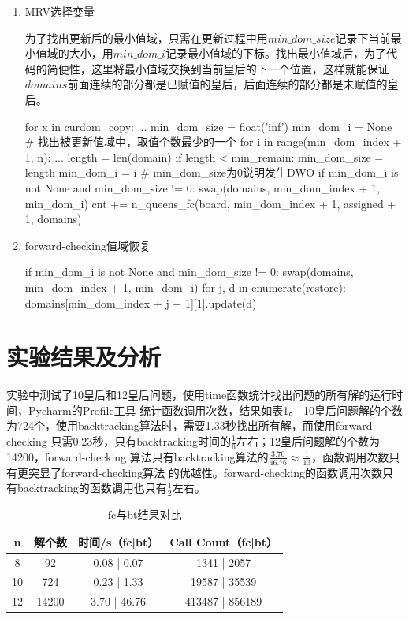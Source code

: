 \documentclass[10pt,letterpaper]{ctexart}
\newcommand{\tabref}[1]{表\ref{#1}}
\begin{document}
\begin{enumerate}[itemindent=2em,label=\arabic*、]
\newpage
\item MRV选择变量
\par \qquad 为了找出更新后的最小值域，只需在更新过程中用$min\_dom\_size$记录下当前最小值域的大小，用$min\_dom\_i$记录最小值域的下标。找出最小值域后，为了代码的简便性，这里将最小值域交换到当前皇后的下一个位置，这样就能保证$domains$前面连续的部分都是已赋值的皇后，后面连续的部分都是未赋值的皇后。
\begin{python}
for x in curdom_copy:
    ...
    min_dom_size = float('inf')
    min_dom_i = None
    # 找出被更新值域中，取值个数最少的一个
    for i in range(min_dom_index + 1, n):
        ...
        length = len(domain)
        if length < min_remain:
            min_dom_size = length
            min_dom_i = i
    # min_dom_size为0说明发生DWO
    if min_dom_i is not None and min_dom_size != 0:
        swap(domains, min_dom_index + 1, min_dom_i)
        cnt += n_queens_fc(board, min_dom_index + 1, assigned + 1, domains)
\end{python}

\item forward-checking值域恢复
\begin{python}
if min_dom_i is not None and min_dom_size != 0:
    swap(domains, min_dom_index + 1, min_dom_i)
for j, d in enumerate(restore):
    domains[min_dom_index + j + 1][1].update(d)
\end{python}

\end{enumerate}

\section{实验结果及分析}
实验中测试了10皇后和12皇后问题，使用time函数统计找出问题的所有解的运行时间，Pycharm的Profile工具
统计函数调用次数，结果如\tabref{tab:fc-bt}。
10皇后问题解的个数为724个，使用backtracking算法时，需要1.33秒找出所有解，而使用forward-checking
只需0.23秒，只有backtracking时间的$\frac{1}{6}$左右；12皇后问题解的个数为14200，forward-checking
算法只有backtracking算法的$\frac{3.70}{46.76}\approx \frac{1}{13}$，函数调用次数只有更突显了forward-checking算法
的优越性。forward-checking的函数调用次数只有backtracking的函数调用也只有$\frac{1}{2}$左右。
\begin{table}[!htbp]
  \centering
  \begin{tabular}{cccc}
    \toprule  
    n& 解个数& 时间/s（fc|bt） &Call Count（fc|bt）\\
    \midrule
    8& 92& 0.08 | 0.07 &1341 | 2057\\
    10& 724& 0.23 | 1.33 &19587 | 35539\\
    12& 14200& 3.70 | 46.76& 413487 | 856189\\
    \bottomrule 
  \end{tabular}
  \caption{fc与bt结果对比}
  \label{tab:fc-bt}
\end{table}
\end{document}

